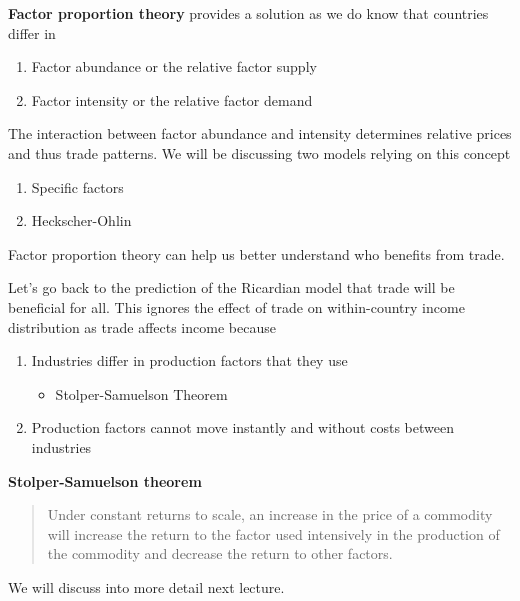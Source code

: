 \documentclass{beamer}
\begin{document}
\begin{frame}
  \textbf{Factor proportion theory} provides a solution as we do know that countries differ in
  \medskip
  \begin{enumerate}
    \item Factor abundance or the relative factor supply
    \item Factor intensity or the relative factor demand
  \end{enumerate}
  \medskip 
  The interaction between factor abundance and intensity determines relative prices and thus trade patterns.  
  We will be discussing two models relying on this concept
  \begin{enumerate}
    \item Specific factors 
    \item Heckscher-Ohlin
  \end{enumerate}
  \medskip
  Factor proportion theory can help us better understand who benefits from trade.
\end{frame}

\begin{frame}
  Let's go back to the prediction of the Ricardian model that trade will be beneficial for all. 
  This ignores the effect of trade on within-country income distribution as trade affects income because
  \medskip
  \begin{enumerate}
    \item Industries differ in production factors that they use
    \begin{itemize}
      \item Stolper-Samuelson Theorem
    \end{itemize}
    \item Production factors cannot move instantly and without costs between industries
  \end{enumerate}
\end{frame}

\begin{frame}
  \textbf{Stolper-Samuelson theorem}   
  \begin{quote}
    Under constant returns to scale, an increase in the price of a commodity will increase the return to the factor used intensively in the production of the commodity and decrease the return to other factors.
  \end{quote}
  \medskip
  We will discuss into more detail next lecture.
\end{frame}
\end{document}
